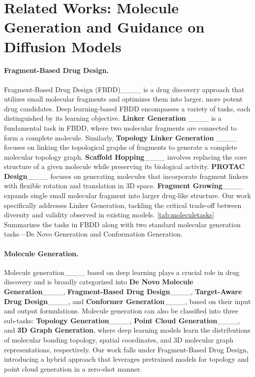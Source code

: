 \section{Related Works: Molecule Generation and Guidance on Diffusion Models}
\label{app:relatedwork}
\paragraph{Fragment-Based Drug Design.} Fragment-Based Drug Design (FBDD)____ is a drug discovery approach that utilizes small molecular fragments and optimizes them into larger, more potent drug candidates. Deep learning-based FBDD encompasses a variety of tasks, each distinguished by its learning objective. \textbf{Linker Generation} ____ is a fundamental task in FBDD, where two molecular fragments are connected to form a complete molecule. Similarly, \textbf{Topology Linker Generation} ____ focuses on linking the topological graphs of fragments to generate a complete molecular topology graph. \textbf{Scaffold Hopping}____ involves replacing the core structure of a given molecule while preserving its biological activity. \textbf{PROTAC Design}____ focuses on generating molecules that incorporate fragment linkers with flexible rotation and translation in 3D space. \textbf{Fragment Growing}____ expands single small molecular fragment into larger drug-like structure. Our work specifically addresses Linker Generation, tackling the critical trade-off between diversity and validity observed in existing models. \cref{tab:moleculetasks} Summarizes the tasks in FBDD along with two standard molecular generation tasks—De Novo Generation and Conformation Generation.

\paragraph{Molecule Generation.} Molecule generation____ based on deep learning plays a crucial role in drug discovery and is broadly categorized into \textbf{De Novo Molecule Generation}____, \textbf{Fragment-Based Drug Design}____, \textbf{Target-Aware Drug Design}____, and \textbf{Conformer Generation}____, based on their input and output formulations. Molecule generation can also be classified into three sub-tasks: \textbf{Topology Generation}____, \textbf{Point Cloud Generation}____, and \textbf{3D Graph Generation}, where deep learning models learn the distributions of molecular bonding topology, spatial coordinates, and 3D molecular graph representations, respectively. Our work falls under Fragment-Based Drug Design, introducing a hybrid approach that leverages pretrained models for topology and point cloud generation in a zero-shot manner.


